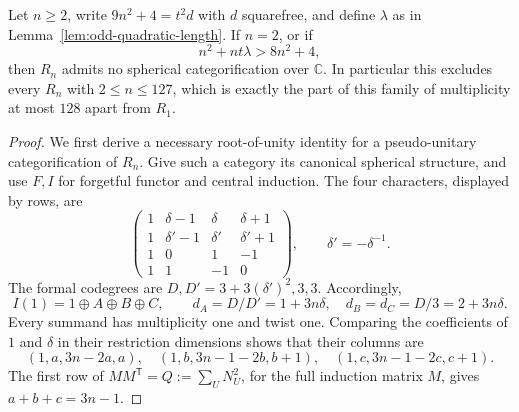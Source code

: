\begin{proposition}\label{prop:quadratic-family-n3-n4}
Let $n\geq2$, write $9n^2+4=t^2d$ with $d$ squarefree, and define
$\lambda$ as in Lemma~\ref{lem:odd-quadratic-length}.
If $n=2$, or if
\begin{equation}\label{eq:rootlength-parameter}
 n^2+nt\lambda>8n^2+4,
\end{equation}
then $R_n$ admits no spherical categorification over $\mathbb C$.
In particular this excludes every $R_n$ with $2\leq n\leq127$,
which is exactly the part of this family of multiplicity at most $128$
apart from $R_1$.
\end{proposition}
\begin{proof}
We first derive a necessary root-of-unity identity for a pseudo-unitary
categorification of $R_n$. Give such a category its canonical spherical
structure, and use $F,I$ for forgetful functor and central induction.
The four characters, displayed by rows, are
\[
 \begin{pmatrix}
 1&\delta-1&\delta&\delta+1\\
 1&\delta'-1&\delta'&\delta'+1\\
 1&0&1&-1\\
 1&1&-1&0
 \end{pmatrix},\qquad \delta'=-\delta^{-1}.
\]
The formal codegrees are $D,D'=3+3(\delta')^2,3,3$. Accordingly,
\[
 I(1)=1\oplus A\oplus B\oplus C,
 \qquad d_A=D/D'=1+3n\delta,\quad d_B=d_C=D/3=2+3n\delta.
\]
Every summand has multiplicity one and twist one. Comparing the coefficients
of $1$ and $\delta$ in their restriction dimensions shows that their columns are
\[
 (1,a,3n-2a,a),\quad
 (1,b,3n-1-2b,b+1),\quad
 (1,c,3n-1-2c,c+1).
\]
The first row of $MM^{\mathsf T}=Q:=\sum_U N_U^2$, for the full induction
matrix $M$, gives $a+b+c=3n-1$.


\end{proof}
